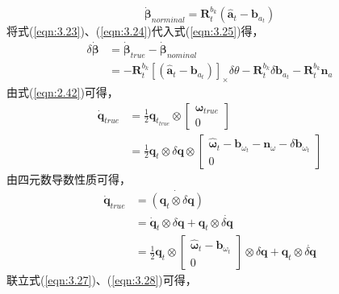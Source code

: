 \begin{equation}
\label{eqn:3.25}
\dot{\bm{\beta}}_{norminal} = \mathbf{R}_t^{b_k}(\hat{\mathbf{a}}_t-\mathbf{b}_{a_t})
\end{equation}
将式(\ref{eqn:3.23})、(\ref{eqn:3.24})代入式(\ref{eqn:3.25})得，
\begin{equation}
\label{eqn:3.26}
\begin{aligned}
\delta \dot{\bm{\beta}} &= \dot{\bm{\beta}}_{true}-\dot{\bm{\beta}}_{nominal} \\
&= -\mathbf{R}_{t}^{b_{k}} [\left(\hat{\mathbf{a}}_{t}-\mathbf{b}_{a_{t}}\right)]_{\times} \delta \theta - \mathbf{R}_{t}^{b_{k}} \delta \mathbf{b}_{a_{t}} - \mathbf{R}_{t}^{b_{k}} \mathbf{n}_{a}
\end{aligned}
\end{equation}
由式(\ref{eqn:2.42})可得，
\begin{equation}
\label{eqn:3.27}
\begin{aligned}
\dot{\mathbf{q}}_{true} &= \frac{1}{2} \mathbf{q}_{t_{true}} \otimes \left[ \begin{array}{c}{\bm{\omega}_{true}} \\ {0}\end{array}\right] \\
&= \frac{1}{2} \mathbf{q}_{t} \otimes \delta \mathbf{q} \otimes \left[ \begin{array}{c}{\hat{\bm{\omega}}_{t}-\mathbf{b}_{\omega_{t}}-\mathbf{n}_{\omega}-\delta \mathbf{b}_{\omega_{t}}} \\ {0}\end{array}\right]
\end{aligned}
\end{equation}
由四元数导数性质可得，
\begin{equation}
\label{eqn:3.28}
\begin{aligned}
\dot{\mathbf{q}}_{true} &= \dot{(\mathbf{q}_{t} \otimes \delta \mathbf{q}) } \\
&= \dot{\mathbf{q}}_{t} \otimes \delta \mathbf{q} + \mathbf{q}_{t} \otimes \dot{\delta \mathbf{q}} \\
&= \frac{1}{2} \mathbf{q}_{t} \otimes \left[ \begin{array}{c}{\hat{\bm{\omega}}_{t}-\mathbf{b}_{\omega_{t}}} \\ {0}\end{array}\right] \otimes \delta \mathbf{q}+\mathbf{q}_{t} \otimes \dot{\delta \mathbf{q}} 
\end{aligned}
\end{equation}
联立式(\ref{eqn:3.27})、(\ref{eqn:3.28})可得，
